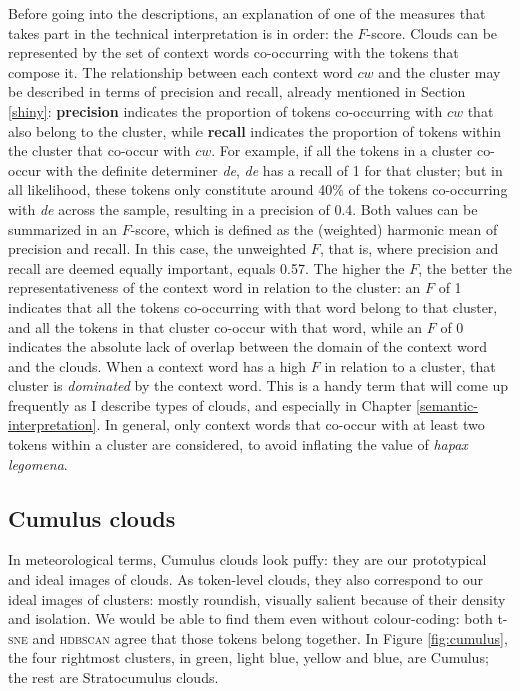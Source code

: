 \documentclass[
]{book}
\begin{document}
Before going into the descriptions, an explanation of one of the measures that takes part in the technical interpretation is in order: the \(F\)-score.
Clouds can be represented by the set of context words co-occurring with the tokens that compose it. The relationship between each context word \(cw\) and the cluster may be described in terms of precision and recall, already mentioned in Section \ref{shiny}: \textbf{precision} indicates the proportion of tokens co-occurring with \(cw\) that also belong to the cluster, while \textbf{recall} indicates the proportion of tokens within the cluster that co-occur with \(cw\). For example, if all the tokens in a cluster co-occur with the definite determiner \emph{de}, \emph{de} has a recall of 1 for that cluster; but in all likelihood, these tokens only constitute around 40\% of the tokens co-occurring with \emph{de} across the sample, resulting in a precision of 0.4. Both values can be summarized in an \(F\)-score, which is defined as the (weighted) harmonic mean of precision and recall. In this case, the unweighted \(F\), that is, where precision and recall are deemed equally important, equals 0.57. The higher the \(F\), the better the representativeness of the context word in relation to the cluster: an \(F\) of 1 indicates that all the tokens co-occurring with that word belong to that cluster, and all the tokens in that cluster co-occur with that word, while an \(F\) of 0 indicates the absolute lack of overlap between the domain of the context word and the clouds.
When a context word has a high \(F\) in relation to a cluster, that cluster is \emph{dominated} by the context word. This is a handy term that will come up frequently as I describe types of clouds, and especially in Chapter \ref{semantic-interpretation}. In general, only context words that co-occur with at least two tokens within a cluster are considered, to avoid inflating the value of \emph{hapax legomena}.

\hypertarget{cumulus-clouds}{%
\subsection{Cumulus clouds}\label{cumulus-clouds}}

In meteorological terms, Cumulus clouds look puffy: they are our prototypical and ideal images of clouds. As token-level clouds, they also correspond to our ideal images of clusters: mostly roundish, visually salient because of their density and isolation. We would be able to find them even without colour-coding: both t-\textsc{sne} and \textsc{hdbscan} agree that those tokens belong together.
In Figure \ref{fig:cumulus}, the four rightmost clusters, in green, light blue, yellow and blue, are Cumulus; the rest are Stratocumulus clouds.
\end{document}
